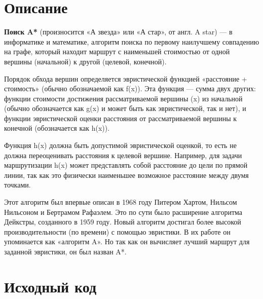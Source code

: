 \section{Описание}

\textbf{Поиск A*} (произносится «А звезда» или «А стар», от англ. A star) — в информатике и математике, алгоритм поиска по первому наилучшему совпадению на графе, который находит маршрут с наименьшей стоимостью от одной вершины (начальной) к другой (целевой, конечной).\newline

Порядок обхода вершин определяется эвристической функцией «расстояние + стоимость» (обычно обозначаемой как f(x)). Эта функция — сумма двух других: функции стоимости достижения рассматриваемой вершины (x) из начальной (обычно обозначается как g(x) и может быть как эвристической, так и нет), и функции эвристической оценки расстояния от рассматриваемой вершины к конечной (обозначается как h(x)).\newline

Функция h(x) должна быть допустимой эвристической оценкой, то есть не должна переоценивать расстояния к целевой вершине. Например, для задачи маршрутизации h(x) может представлять собой расстояние до цели по прямой линии, так как это физически наименьшее возможное расстояние между двумя точками.\newline

Этот алгоритм был впервые описан в 1968 году Питером Хартом, Нильсом Нильсоном и Бертрамом Рафаэлем. Это по сути было расширение алгоритма Дейкстры, созданного в 1959 году. Новый алгоритм достигал более высокой производительности (по времени) с помощью эвристики. В их работе он упоминается как «алгоритм A». Но так как он вычисляет лучший маршрут для заданной эвристики, он был назван A*.\newline
\pagebreak

\section{Исходный код}


